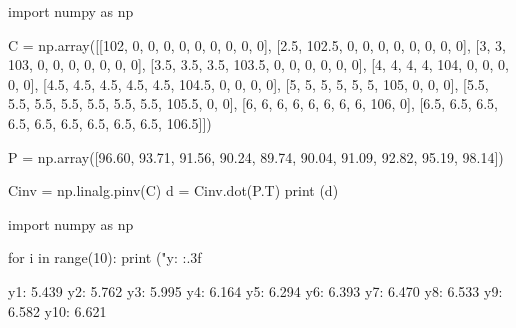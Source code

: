 \cprotEnv\begin{solution}
\begin{ipython}
import numpy as np

C = np.array([[102, 0, 0, 0, 0, 0, 0, 0, 0, 0],
              [2.5, 102.5, 0, 0, 0, 0, 0, 0, 0, 0],
              [3, 3, 103, 0, 0, 0, 0, 0, 0, 0],
              [3.5, 3.5, 3.5, 103.5, 0, 0, 0, 0, 0, 0],
              [4, 4, 4, 4, 104, 0, 0, 0, 0, 0],
              [4.5, 4.5, 4.5, 4.5, 4.5, 104.5, 0, 0, 0, 0],
              [5, 5, 5, 5, 5, 5, 105, 0, 0, 0],
              [5.5, 5.5, 5.5, 5.5, 5.5, 5.5, 5.5, 105.5, 0, 0],
              [6, 6, 6, 6, 6, 6, 6, 6, 106, 0],
              [6.5, 6.5, 6.5, 6.5, 6.5, 6.5, 6.5, 6.5, 6.5, 106.5]])

P = np.array([96.60, 93.71, 91.56, 90.24, 89.74, 
              90.04, 91.09, 92.82, 95.19, 98.14])

Cinv = np.linalg.pinv(C)
d = Cinv.dot(P.T)
print (d)
\end{ipython}
\begin{ioutput}
[0.94705882 0.89114491 0.83539212 0.7814726  0.72999737 0.68140865
 0.63578693 0.59296268 0.55300618 0.51574181]
\end{ioutput}

\begin{ipython}
import numpy as np

for i in range(10):
    print ("y{}: {:.3f}%
\end{ipython}
\begin{ioutput}
y1: 5.439%
y2: 5.762%
y3: 5.995%
y4: 6.164%
y5: 6.294%
y6: 6.393%
y7: 6.470%
y8: 6.533%
y9: 6.582%
y10: 6.621%
\end{ioutput}
\end{solution}
